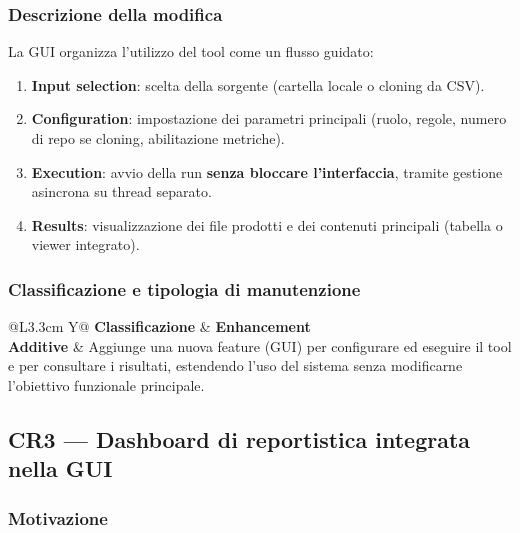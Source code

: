 \documentclass[11pt,a4paper]{article}
\newcommand{\thead}[1]{\textbf{#1}}
\begin{document}
\subsubsection*{Descrizione della modifica}

La GUI organizza l'utilizzo del tool come un flusso guidato:

\begin{enumerate}
  \item \textbf{Input selection}: scelta della sorgente (cartella locale o
    cloning da CSV).
  \item \textbf{Configuration}: impostazione dei parametri principali (ruolo,
    regole, numero di repo se cloning, abilitazione metriche).
  \item \textbf{Execution}: avvio della run \textbf{senza bloccare
    l'interfaccia}, tramite gestione asincrona su thread separato.
  \item \textbf{Results}: visualizzazione dei file prodotti e dei contenuti
    principali (tabella o viewer integrato).
\end{enumerate}

\subsubsection*{Classificazione e tipologia di manutenzione}

\begin{table}[H]
  \centering\small
  \caption{CR2 --- Classificazione}
  \label{tab:cr2-class}
  \begin{tabularx}{\linewidth}{@{}L{3.3cm} Y@{}}
    \toprule
    \thead{Classificazione} & \textbf{Enhancement}\\
    \midrule
    \thead{Additive} & Aggiunge una nuova feature (GUI) per configurare ed
      eseguire il tool e per consultare i risultati, estendendo l'uso del
      sistema senza modificarne l'obiettivo funzionale principale.\\
    \bottomrule
  \end{tabularx}
\end{table}

\subsection{CR3 --- Dashboard di reportistica integrata nella GUI}
\label{sec:cr3}

\subsubsection*{Motivazione}
\end{document}
